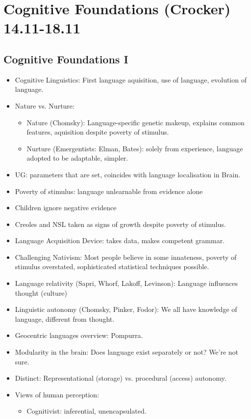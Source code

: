 \documentclass[11pt]{article}
\newenvironment{itemise}{
\begin{itemize}
  \setlength{\itemsep}{1pt}
  \setlength{\parskip}{0pt}
  \setlength{\parsep}{0pt}
}{\end{itemize}}
\begin{document}
\section{ Cognitive Foundations (Crocker) 14.11-18.11}
\subsection{Cognitive Foundations I}
\begin{itemise}
 \item Cognitive Linguistics: First language aquisition, use of language, evolution of language.
 \item Nature vs. Nurture:
 \begin{itemise}
	\item Nature (Chomsky): Language-specific genetic makeup, explains common features, aquisition despite poverty of stimulus.
	\item Nurture (Emergentists: Elman, Bates): solely from experience, language adopted to be adaptable, simpler.
 \end{itemise}
 \item UG: parameters that are set, coincides with language localisation in Brain.
 \item Poverty of stimulus: language unlearnable from evidence alone
 \item Children ignore negative evidence
 \item Creoles and NSL taken as signs of growth despite poverty of stimulus.
 \item Language Acquisition Device: takes data, makes competent grammar.
 \item Challenging Nativism: Most people believe in some innateness, poverty of stimulus overstated, sophisticated statistical techniques possible.
 \item Language relativity (Sapri, Whorf, Lakoff, Levinson): Language influences thought (culture)
 \item Linguistic autonomy (Chomsky, Pinker, Fodor): We all have knowledge of language, different from thought.
 \item Geocentric languages overview: Pompurra.
 \item Modularity in the brain: Does language exist separately or not? We're not sure.
 \item Distinct: Representational (storage) vs. procedural (access)  autonomy.
 \item Views of human perception:
 \begin{itemise} 
 \item Cognitivist: inferential, unencapsulated. 

\end{itemise}
\end{itemise}
\end{document}
